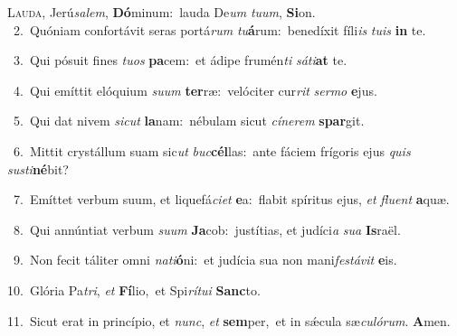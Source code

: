 \lettrine{\initial\textcolor{\initialcolor}{L}}{auda,} Jerú\-\textit{sa}\-\textit{lem}, \textbf{Dó}\-minum:~\star lauda De\textit{um} \textit{tu}\-\textit{um}, \textbf{Si}\-on.\\
{\numbfont\textcolor{\numbcolor}{~2.}}~Quóniam confortávit seras portá\textit{rum} \textit{tu}\-\textbf{á}rum:~\star benedíxit fíli\textit{is} \textit{tu}\-\textit{is} \textbf{in} te.\par
{\numbfont\textcolor{\numbcolor}{~3.}}~Qui pósuit fines \textit{tu}\-\textit{os} \textbf{pa}\-cem:~\star et ádipe frumén\textit{ti} \textit{sá}\-\textit{ti}\textbf{at} te.\par
{\numbfont\textcolor{\numbcolor}{~4.}}~Qui emíttit elóquium \textit{su}\-\textit{um} \textbf{ter}\-ræ:~\star velóciter cur\textit{rit} \textit{ser}\-\textit{mo} \textbf{e}\-jus.\par
{\numbfont\textcolor{\numbcolor}{~5.}}~Qui dat nivem \textit{sic}\-\textit{ut} \textbf{la}\-nam:~\star nébulam sicut \textit{cí}\-\textit{ne}\textit{rem} \textbf{spar}\-git.\par
{\numbfont\textcolor{\numbcolor}{~6.}}~Mittit crystállum suam sic\textit{ut} \textit{buc}\-\textbf{cél}las:~\star ante fáciem frígoris ejus \textit{quis} \textit{sus}\-\textit{ti}\textbf{né}bit?\par
{\numbfont\textcolor{\numbcolor}{~7.}}~Emíttet verbum suum, et liquefá\-\textit{ci}\-\textit{et} \textbf{e}\-a:~\star flabit spíritus ejus, \textit{et} \textit{flu}\-\textit{ent} \textbf{a}\-quæ.\par
{\numbfont\textcolor{\numbcolor}{~8.}}~Qui annúntiat verbum \textit{su}\-\textit{um} \textbf{Ja}\-cob:~\star justítias, et judíci\textit{a} \textit{su}\-\textit{a} \textbf{Is}\-raël.\par
{\numbfont\textcolor{\numbcolor}{~9.}}~Non fecit táliter omni \textit{na}\-\textit{ti}\textbf{ó}ni:~\star et judícia sua non mani\-\textit{fes}\-\textit{tá}\textit{vit} \textbf{e}\-is.\par
{\numbfont\textcolor{\numbcolor}{10.}}~Glória Pa\-\textit{tri}\-, \textit{et} \textbf{Fí}\-lio,~\star et Spi\-\textit{rí}\-\textit{tu}\textit{i} \textbf{Sanc}\-to.\par
{\numbfont\textcolor{\numbcolor}{11.}}~Sicut erat in princípio, et \textit{nunc}\-, \textit{et} \textbf{sem}\-per,~\star et in sǽcula sæ\-\textit{cu}\-\textit{ló}\textit{rum}. \textbf{A}\-men.\par
